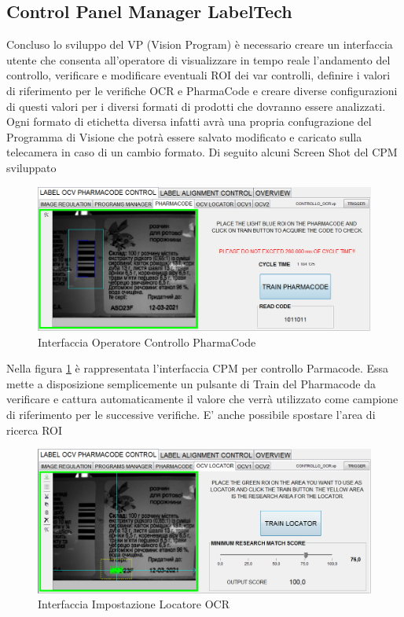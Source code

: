 \documentclass[12pt, a4paper, oneside]{book}
\begin{document}
\subsection{Control Panel Manager LabelTech}
Concluso lo sviluppo del VP (Vision Program) è necessario creare un interfaccia utente che consenta all'operatore di visualizzare in tempo reale l'andamento del controllo, verificare e modificare eventuali ROI dei var controlli, definire i valori di riferimento per le verifiche OCR e PharmaCode e creare diverse configurazioni di questi valori per i diversi formati di prodotti che dovranno essere analizzati. Ogni formato di etichetta diversa infatti avrà una propria confugrazione del Programma di Visione che potrà essere salvato modificato e caricato sulla telecamera in caso di un cambio formato. Di seguito alcuni Screen Shot del CPM sviluppato

\begin{figure}[H]
	\centering
	\includegraphics[width=13cm]{Immagini/VIS14}
	\caption{Interfaccia Operatore Controllo PharmaCode}
	\label{vis14}
\end{figure}

Nella figura \ref{vis14} è rappresentata l'interfaccia CPM per controllo Parmacode. Essa mette a disposizione semplicemente un pulsante di Train del Pharmacode da verificare e cattura automaticamente il valore che verrà utilizzato come campione di riferimento per le successive verifiche. E' anche possibile spostare l'area di ricerca ROI


\begin{figure}[H]
	\centering
	\includegraphics[width=13cm]{Immagini/VIS15}
	\caption{Interfaccia Impostazione Locatore OCR}
	\label{vis15}
\end{figure}
\end{document}

